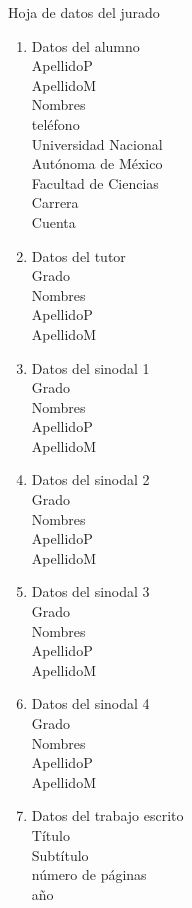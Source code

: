 \thispagestyle{empty}
\begin{center}
  {\LARGE Hoja de datos del jurado}
\end{center}
\begin{multicols*}{2}
  \begin{enumerate}
    \item Datos del alumno\\
          ApellidoP\\
          ApellidoM\\
          Nombres\\
          teléfono\\
          Universidad Nacional\\
          Autónoma de México\\
          Facultad de Ciencias\\
          Carrera\\
          Cuenta
    \item Datos del tutor\\
          Grado\\
          Nombres\\
          ApellidoP\\
          ApellidoM
    \item Datos del sinodal 1\\
          Grado\\
          Nombres\\
          ApellidoP\\
          ApellidoM
    \item Datos del sinodal 2\\
          Grado\\
          Nombres\\
          ApellidoP\\
          ApellidoM
    \item Datos del sinodal 3\\
          Grado\\
          Nombres\\
          ApellidoP\\
          ApellidoM
    \item Datos del sinodal 4\\
          Grado\\
          Nombres\\
          ApellidoP\\
          ApellidoM
    \item Datos del trabajo escrito\\
          Título\\
          Subtítulo\\
          número de páginas\\
          año
  \end{enumerate}
\end{multicols*}
\cleardoublepage
